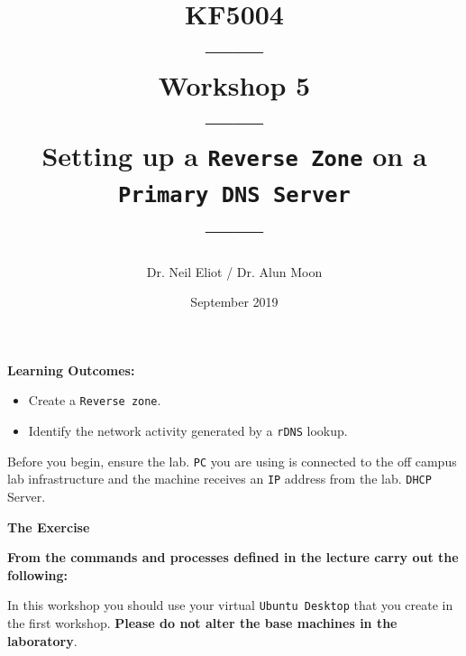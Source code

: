 \documentclass[11pt]{article}
\begin{document}
\author{Dr. Neil Eliot / Dr. Alun Moon}
\title{KF5004\\------\\Workshop 5\\------\\Setting up a \texttt{Reverse Zone} on a \texttt{Primary DNS Server}\\------}
\date{September 2019}
\maketitle

\newpage



\noindent\textbf{Learning Outcomes:}
\begin{itemize}
    \item Create a \texttt{Reverse zone}.
    \item Identify the network activity generated by a \texttt{rDNS} lookup.
\end{itemize}


\begin{tcolorbox}[title={\textbf{Important:}}]
    Before you begin, ensure the lab. \texttt{PC} you are using is connected to the off campus lab infrastructure and the machine receives an \texttt{IP} address from the lab. \texttt{DHCP} Server.
\end{tcolorbox}
\newpage

\noindent\textbf{The Exercise}\\
\begin{tcolorbox}[colback=blue!20]
    \noindent\textbf{From the commands and processes defined in the lecture carry out the following:}
\end{tcolorbox}


\begin{tcolorbox}[title={\textbf{NOTE:}}]
    In this workshop you should use your virtual \texttt{Ubuntu Desktop} that you create in the first workshop. \textbf{Please do not alter the base machines in the laboratory}.
\end{tcolorbox}
\end{document}

